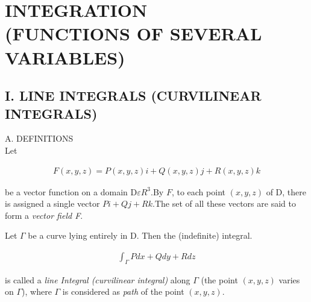 \documentclass[11pt,reqno]{amsbook}
\begin{document}
    \setcounter{chapter}{1}
    \chapter{\large INTEGRATION \\ (FUNCTIONS OF SEVERAL VARIABLES)}
    

    \setcounter{section}{4}
    \section{I. LINE INTEGRALS (CURVILINEAR INTEGRALS)}
    
    \qquad A. DEFINITIONS \\
    
    \qquad Let
    
    \begin{align*}
        F(x, y, z) = P(x, y, z)i + Q(x, y, z)j + R(x, y, z)k   
    \end{align*}
    
    \begin{flushleft}
        be a vector function on a domain D$\varepsilon R^3$.By $F$, to each point $(x, y, z)$ of D, there is assigned a single vector $Pi+Qj+Rk$.The set of all these vectors are said to form a \textit{vector field F}.
    \end{flushleft}
    
    Let $\Gamma$ be a curve lying entirely in D. Then the (indefinite) integral.
    
    \begin{align}
        \int_{\Gamma} Pdx + Qdy + Rdz\tag{1}
    \end{align}
    
    \begin{flushleft}
        is called a \textit{line Integral (curvilinear integral)} along $\Gamma$ (the point $(x, y, z)$ varies on $\Gamma$), where $\Gamma$ is considered as \textit{path} of the point $(x, y, z)$.
    \end{flushleft}
    
\end{document}
